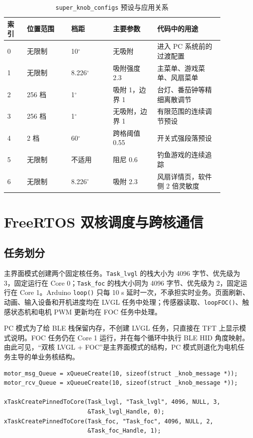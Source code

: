 \begin{table}[H]
\centering
\small
\begin{tabular}{p{0.08\linewidth}p{0.18\linewidth}p{0.17\linewidth}p{0.18\linewidth}p{0.27\linewidth}}
\toprule
索引 & 位置范围 & 档距 & 主要参数 & 代码中的用途 \\
\midrule
0 & 无限制 & 10$^\circ$ & 无吸附 & 进入 PC 系统前的过渡配置 \\
1 & 无限制 & 8.226$^\circ$ & 吸附强度 2.3 & 主菜单、游戏菜单、风扇菜单 \\
2 & 256 档 & 1$^\circ$ & 吸附 1，边界 1 & 台灯、番茄钟等精细离散调节 \\
3 & 256 档 & 1$^\circ$ & 无吸附，边界 1 & 有限范围的连续调节预设 \\
4 & 2 档 & 60$^\circ$ & 跨格阈值 0.55 & 开关式强段落预设 \\
5 & 无限制 & 不适用 & 阻尼 0.6 & 钓鱼游戏的连续追踪 \\
6 & 无限制 & 8.226$^\circ$ & 吸附 2.3 & 风扇详情页，软件侧 2 倍灵敏度 \\
\bottomrule
\end{tabular}
\caption{\texttt{super\_knob\_configs} 预设与应用关系}
\label{tab:haptic-configs}
\end{table}

\section{FreeRTOS 双核调度与跨核通信}

\subsection{任务划分}

主界面模式创建两个固定核任务。\texttt{Task\_lvgl} 的栈大小为 4096 字节、优先级为 3，固定运行在 Core 0；\texttt{Task\_foc} 的栈大小同为 4096 字节、优先级为 2，固定运行在 Core 1。Arduino \texttt{loop()} 只每 10 s 延时一次，不承担实时业务。页面刷新、动画、输入设备和开机进度均在 LVGL 任务中处理；传感器读取、\texttt{loopFOC()}、触感状态机和电机 PWM 更新均在 FOC 任务中处理。

PC 模式为了给 BLE 栈保留内存，不创建 LVGL 任务，只直接在 TFT 上显示模式说明。FOC 任务仍在 Core 1 运行，并在每个循环中执行 BLE HID 角度映射。由此可见，“双核 LVGL + FOC”是主界面模式的结构，PC 模式则退化为电机任务主导的单业务核结构。

\begin{lstlisting}[basicstyle=\ttfamily\footnotesize,caption={任务与队列创建的核心结构},label={lst:task-create}]
motor_msg_Queue = xQueueCreate(10, sizeof(struct _knob_message *));
motor_rcv_Queue = xQueueCreate(10, sizeof(struct _knob_message *));

xTaskCreatePinnedToCore(Task_lvgl, "Task_lvgl", 4096, NULL, 3,
                        &Task_lvgl_Handle, 0);
xTaskCreatePinnedToCore(Task_foc, "Task_foc", 4096, NULL, 2,
                        &Task_foc_Handle, 1);
\end{lstlisting}

